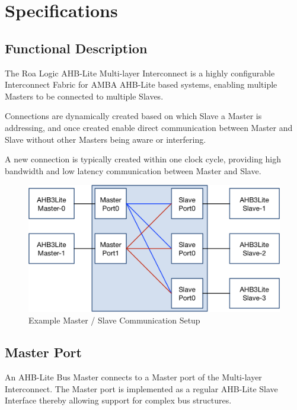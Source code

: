 \chapter{Specifications}\label{specifications}


\section{Functional Description}\label{functional-description}


The Roa Logic AHB-Lite Multi-layer Interconnect is a highly configurable
Interconnect Fabric for AMBA AHB-Lite based systems, enabling multiple
Masters to be connected to multiple Slaves.

Connections are dynamically created based on which Slave a Master is
addressing, and once created enable direct communication between Master
and Slave without other Masters being aware or interfering.

A new connection is typically created within one clock cycle, providing
high bandwidth and low latency communication between Master and Slave.

\begin{figure}[tbh]
	\includegraphics{assets/img/ahb-lite-switch-sys1.png}
	\caption{Example Master / Slave Communication Setup}
	\label{fig:ahb-lite-switch-sys1}
\end{figure}

\section{Master Port}\label{master-port}

An AHB-Lite Bus Master connects to a Master port of the Multi-layer
Interconnect. The Master port is implemented as a regular AHB-Lite Slave
Interface thereby allowing support for complex bus structures.

